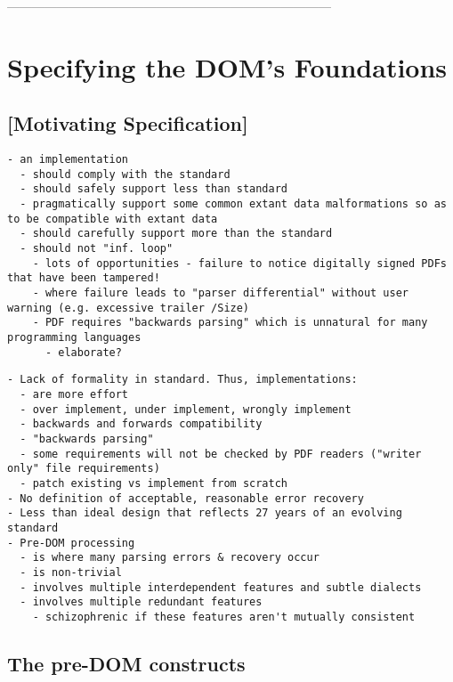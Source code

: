 ------------------------------------------------------------------------------
\section{Specifying the DOM's Foundations }
\label{sec:specifying}


\subsection{[Motivating Specification]}

\begin{lstlisting}[style=meta]
- an implementation
  - should comply with the standard
  - should safely support less than standard
  - pragmatically support some common extant data malformations so as to be compatible with extant data
  - should carefully support more than the standard
  - should not "inf. loop"
    - lots of opportunities - failure to notice digitally signed PDFs that have been tampered!
    - where failure leads to "parser differential" without user warning (e.g. excessive trailer /Size)
    - PDF requires "backwards parsing" which is unnatural for many programming languages
      - elaborate?
\end{lstlisting}

\begin{lstlisting}[style=meta]
- Lack of formality in standard. Thus, implementations:
  - are more effort
  - over implement, under implement, wrongly implement
  - backwards and forwards compatibility
  - "backwards parsing"
  - some requirements will not be checked by PDF readers ("writer only" file requirements) 
  - patch existing vs implement from scratch
- No definition of acceptable, reasonable error recovery
- Less than ideal design that reflects 27 years of an evolving standard
- Pre-DOM processing
  - is where many parsing errors & recovery occur
  - is non-trivial
  - involves multiple interdependent features and subtle dialects
  - involves multiple redundant features
    - schizophrenic if these features aren't mutually consistent
\end{lstlisting}

\subsection{The pre-DOM constructs}
  
